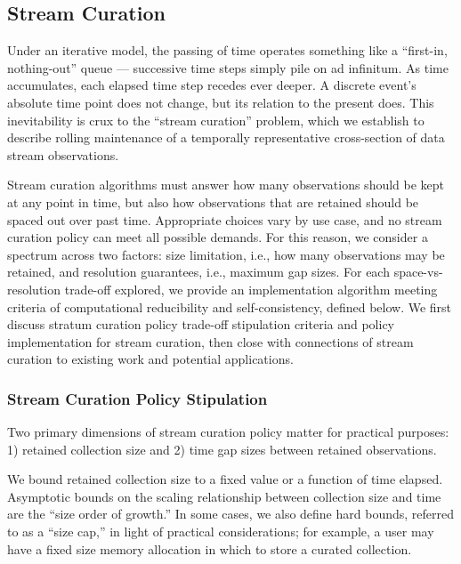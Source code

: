 \subsection{Stream Curation} \label{sec:streaming-curation}

Under an iterative model, the passing of time operates something like a ``first-in, nothing-out'' queue --- successive time steps simply pile on ad infinitum.
As time accumulates, each elapsed time step recedes ever deeper.
A discrete event's absolute time point does not change, but its relation to the present does.  %
This inevitability is crux to the ``stream curation'' problem, which we establish to describe rolling maintenance of a temporally representative cross-section of data stream observations.

Stream curation algorithms must answer how many observations should be kept at any point in time, but also how observations that are retained should be spaced out over past time.
Appropriate choices vary by use case, and no stream curation policy can meet all possible demands.
For this reason, we consider a spectrum across two factors: size limitation, i.e., how many observations may be retained, and resolution guarantees, i.e., maximum gap sizes.
For each space-vs-resolution trade-off explored, we provide an implementation algorithm meeting criteria of computational reducibility and self-consistency, defined below.
We first discuss stratum curation policy trade-off stipulation criteria and policy implementation for stream curation, then close with connections of stream curation to existing work and potential applications.

\subsubsection{Stream Curation Policy Stipulation}

Two primary dimensions of stream curation policy matter for practical purposes: 1) retained collection size and 2) time gap sizes between retained observations.

We bound retained collection size to a fixed value or a function of time elapsed.
Asymptotic bounds on the scaling relationship between collection size and time are the ``size order of growth.''
In some cases, we also define hard bounds, referred to as a ``size cap,'' in light of practical considerations; for example, a user may have a fixed size memory allocation in which to store a curated collection.

